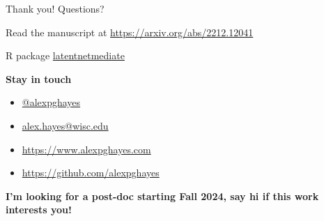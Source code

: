 \documentclass[aspectratio=169]{beamer}
\theoremstyle{remark}
\begin{document}



\begin{frame}{Thank you! Questions?}

    Read the manuscript at \url{https://arxiv.org/abs/2212.12041}

    R package \href{https://github.com/alexpghayes/latentnetmediate}{latentnetmediate}

    \textbf{Stay in touch}

    \begin{itemize}
        \item[]  \href{https://twitter.com/alexpghayes}{@alexpghayes}
        \item[]  \href{mailto:alex.hayes@wisc.edu}{alex.hayes@wisc.edu}
        \item[]  \url{https://www.alexpghayes.com} %
        \item[]  \url{https://github.com/alexpghayes}
    \end{itemize}

    \textbf{I'm looking for a post-doc starting Fall 2024, say hi if this work interests you!}
\end{frame}

\appendix





\end{document}
